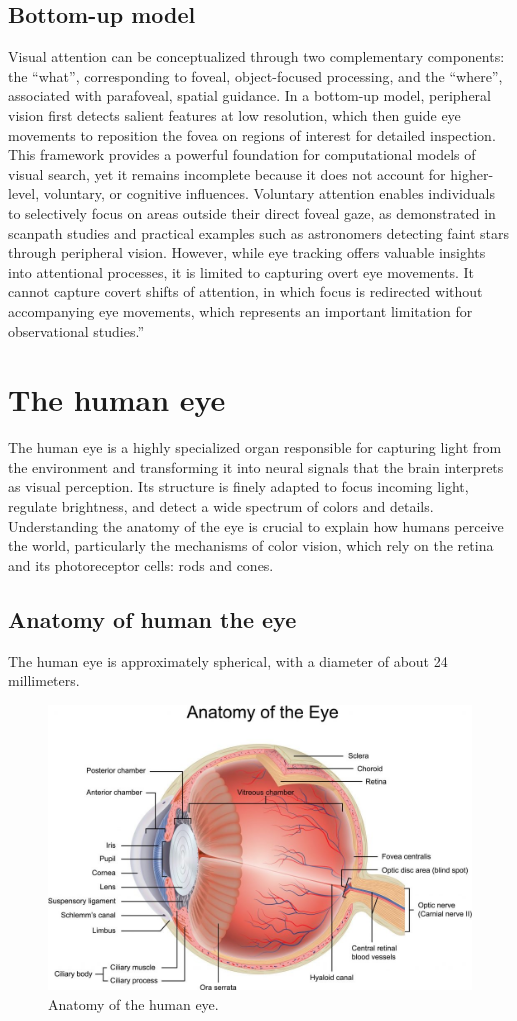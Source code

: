 \documentclass[12pt]{report}
\begin{document}
\subsection{Bottom-up model}
Visual attention can be conceptualized through two complementary components: the “what”, corresponding to foveal, object-focused processing, and the “where”, associated with parafoveal, spatial guidance.
In a bottom-up model, peripheral vision first detects salient features at low resolution, which then guide eye movements to reposition the fovea on regions of interest for detailed inspection.
This framework provides a powerful foundation for computational models of visual search, yet it remains incomplete because it does not account for higher-level, voluntary, or cognitive influences.
Voluntary attention enables individuals to selectively focus on areas outside their direct foveal gaze, as demonstrated in scanpath studies and practical examples such as astronomers detecting faint stars through peripheral vision. 
However, while eye tracking offers valuable insights into attentional processes, it is limited to capturing overt eye movements. 
It cannot capture covert shifts of attention, in which focus is redirected without accompanying eye movements, which represents an important limitation for observational studies.”

\section{The human eye}

The human eye is a highly specialized organ responsible for capturing light from the environment and transforming it into neural signals that the brain interprets as visual perception.
Its structure is finely adapted to focus incoming light, regulate brightness, and detect a wide spectrum of colors and details.
Understanding the anatomy of the eye is crucial to explain how humans perceive the world, particularly the mechanisms of color vision, which rely on the retina and its photoreceptor cells: rods and cones.

\subsection{Anatomy of human the eye}

The human eye is approximately spherical, with a diameter of about 24 millimeters. 

\begin{figure}[ht]
    \centering
    \includegraphics[width = 0.6
    \textwidth]{Images/Theory/occhio.jpg}
    \caption{Anatomy of the human eye.}
    \label{fig:ana}
\end{figure}
\end{document}
